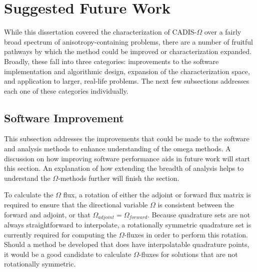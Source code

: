 \section{Suggested Future Work}
\label{sec:futurewrk}

While this dissertation covered the characterization of CADIS-$\Omega$ over a
fairly broad spectrum of anisotropy-containing problems, there are a number of
fruitful pathways by which the method could be improved or characterization
expanded. Broadly, these fall into three categories: improvements to the
software implementation and algorithmic design, expansion of the
characterization space, and application to larger, real-life problems.
The next few
subsections addresses each one of these categories individually.

\subsection{Software Improvement}
\label{subsec:softwareimp}

This subsection addresses the improvements that could be
made to the software and analysis methods to enhance understanding of the omega
methods. A discussion on how improving software performance aids in
future work will start this section.
An explanation of how extending the breadth of analysis
helps to understand the $\Omega$-methods further will finish the section.

To calculate the $\Omega$ flux, a rotation of either the adjoint or forward
flux matrix is
required to ensure that the directional variable $\Omega$ is consistent between
the forward and adjoint,
or that $\Omega_{adjoint} = \Omega_{forward}$. Because quadrature sets
are not always straightforward to interpolate, a rotationally symmetric
quadrature set is currently required for computing the $\Omega$-fluxes in order
to perform this rotation.
Should a method
be developed that does have interpolatable quadrature points, it would be a good
candidate to calculate $\Omega$-fluxes for solutions that are not
rotationally symmetric.

